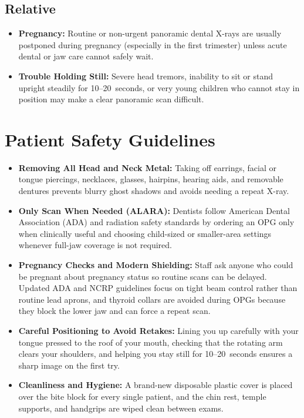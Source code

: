 \subsection{Relative}
\begin{itemize}
\item \textbf{Pregnancy:} Routine or non-urgent panoramic dental X-rays are usually postponed during pregnancy (especially in the first trimester) unless acute dental or jaw care cannot safely wait.
\item \textbf{Trouble Holding Still:} Severe head tremors, inability to sit or stand upright steadily for 10--20~seconds, or very young children who cannot stay in position may make a clear panoramic scan difficult.
\end{itemize}

\section{Patient Safety Guidelines}
\begin{itemize}
\item \textbf{Removing All Head and Neck Metal:} Taking off earrings, facial or tongue piercings, necklaces, glasses, hairpins, hearing aids, and removable dentures prevents blurry ghost shadows and avoids needing a repeat X-ray.
\item \textbf{Only Scan When Needed (ALARA):} Dentists follow American Dental Association (ADA) and radiation safety standards by ordering an OPG only when clinically useful and choosing child-sized or smaller-area settings whenever full-jaw coverage is not required.
\item \textbf{Pregnancy Checks and Modern Shielding:} Staff ask anyone who could be pregnant about pregnancy status so routine scans can be delayed. Updated ADA and NCRP guidelines focus on tight beam control rather than routine lead aprons, and thyroid collars are avoided during OPGs because they block the lower jaw and can force a repeat scan.
\item \textbf{Careful Positioning to Avoid Retakes:} Lining you up carefully with your tongue pressed to the roof of your mouth, checking that the rotating arm clears your shoulders, and helping you stay still for 10--20~seconds ensures a sharp image on the first try.
\item \textbf{Cleanliness and Hygiene:} A brand-new disposable plastic cover is placed over the bite block for every single patient, and the chin rest, temple supports, and handgrips are wiped clean between exams.
\end{itemize}


